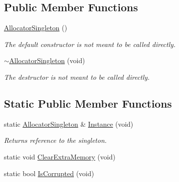 \subsection*{Public Member Functions}
\begin{DoxyCompactItemize}
\item 
\hypertarget{classLoki_1_1AllocatorSingleton_ac1ce92a825643f114d555fea170e2a99}{}\hyperlink{classLoki_1_1AllocatorSingleton_ac1ce92a825643f114d555fea170e2a99}{Allocator\+Singleton} ()\label{classLoki_1_1AllocatorSingleton_ac1ce92a825643f114d555fea170e2a99}

\begin{DoxyCompactList}\small\item\em The default constructor is not meant to be called directly. \end{DoxyCompactList}\item 
\hypertarget{classLoki_1_1AllocatorSingleton_af4248c104f7c04f4dbef16543083be53}{}\hyperlink{classLoki_1_1AllocatorSingleton_af4248c104f7c04f4dbef16543083be53}{$\sim$\+Allocator\+Singleton} (void)\label{classLoki_1_1AllocatorSingleton_af4248c104f7c04f4dbef16543083be53}

\begin{DoxyCompactList}\small\item\em The destructor is not meant to be called directly. \end{DoxyCompactList}\end{DoxyCompactItemize}
\subsection*{Static Public Member Functions}
\begin{DoxyCompactItemize}
\item 
\hypertarget{classLoki_1_1AllocatorSingleton_a0de7839b1e888e11ff44bc50b78ca7d7}{}static \hyperlink{classLoki_1_1AllocatorSingleton}{Allocator\+Singleton} \& \hyperlink{classLoki_1_1AllocatorSingleton_a0de7839b1e888e11ff44bc50b78ca7d7}{Instance} (void)\label{classLoki_1_1AllocatorSingleton_a0de7839b1e888e11ff44bc50b78ca7d7}

\begin{DoxyCompactList}\small\item\em Returns reference to the singleton. \end{DoxyCompactList}\item 
static void \hyperlink{classLoki_1_1AllocatorSingleton_a082b4ba1c6574c5bed916c55ecf46e82}{Clear\+Extra\+Memory} (void)
\item 
static bool \hyperlink{classLoki_1_1AllocatorSingleton_a033978d127f16d2da0fd79d31ee75713}{Is\+Corrupted} (void)
\end{DoxyCompactItemize}
